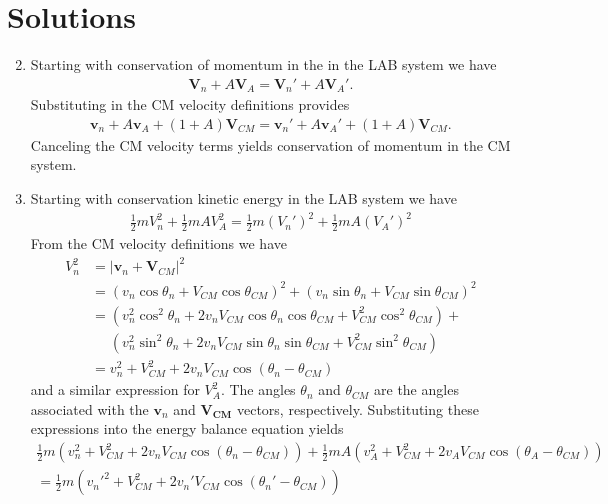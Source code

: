 \documentclass[11pt]{article}
\renewcommand\vec{\mathbf}
\begin{document}
\section{Solutions}
\label{sec:orgheadline12}
\begin{enumerate}
\setcounter{enumi}{1}
\item Starting with conservation of momentum in the in the LAB system we have
\begin{align}
  \vec{V}_n + A \vec{V}_A = \vec{V}_n' + A \vec{V}_A'.
\end{align}
Substituting in the CM velocity definitions provides
\begin{align}
  \vec{v}_n + A \vec{v}_A + (1+A) \vec{V}_{CM} = \vec{v}_n' + A \vec{v}_A' + (1+A) \vec{V}_{CM}.
\end{align}
Canceling the CM velocity terms yields conservation of momentum in the CM system.
\item Starting with conservation kinetic energy in the LAB system we have
\begin{align}
  \frac{1}{2} m V_n^2 + \frac{1}{2}mA V_A^2 = \frac{1}{2} m (V_n')^2 + \frac{1}{2}mA (V_A')^2 
\end{align}
From the CM velocity definitions we have
\begin{align}
  V_n^2 &= \left| \vec{v}_n + \vec{V}_{CM} \right|^2 \\
        &= \left( v_n \cos\theta_n + V_{CM} \cos\theta_{CM} \right)^2 +
           \left( v_n \sin\theta_n + V_{CM} \sin\theta_{CM} \right)^2 \\
        &= \left( v_n^2 \cos^2\theta_n + 2 v_n V_{CM} \cos\theta_n \cos\theta_{CM} + V_{CM}^2 \cos^2\theta_{CM} \right) + \\
        &\phantom{=} \left( v_n^2 \sin^2\theta_n + 2 v_n V_{CM} \sin\theta_n \sin\theta_{CM} + V_{CM}^2 \sin^2\theta_{CM} \right) \\
        &= v_n^2 + V_{CM}^2 + 2 v_n V_{CM} \cos(\theta_n-\theta_{CM})
\end{align}
and a similar expression for \(V_A^2\).  The angles \(\theta_n\) and \(\theta_{CM}\) are the angles associated with the \(\vec{v}_n\) and \(\vec{V_{CM}}\) vectors, respectively.  Substituting these expressions into the energy balance equation yields
\begin{align}
  \frac{1}{2} m (v_n^2 + V_{CM}^2 + 2 v_n V_{CM} \cos(\theta_n-\theta_{CM})) 
+ \frac{1}{2}mA (v_A^2 + V_{CM}^2 + 2 v_A V_{CM} \cos(\theta_A-\theta_{CM})) \\
= \frac{1}{2} m (v_n'^2 + V_{CM}^2 + 2 v_n' V_{CM} \cos(\theta_n'-\theta_{CM}))

\end{align}
\end{enumerate}
\end{document}
